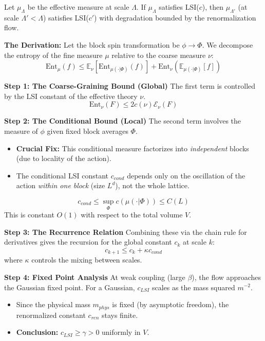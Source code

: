 \begin{theorem}
Let $\mu_\Lambda$ be the effective measure at scale $\Lambda$. If $\mu_\Lambda$ satisfies LSI($c$), then $\mu_{\Lambda'}$ (at scale $\Lambda' < \Lambda$) satisfies LSI($c'$) with degradation bounded by the renormalization flow.
\end{theorem}

\textbf{The Derivation:}
Let the block spin transformation be $\phi \to \Phi$. We decompose the entropy of the fine measure $\mu$ relative to the coarse measure $\nu$:
\begin{equation}
\text{Ent}_\mu(f) \le \mathbb{E}_\nu [\text{Ent}_{\mu(\cdot|\Phi)}(f)] + \text{Ent}_\nu(\mathbb{E}_{\mu(\cdot|\Phi)}[f])
\end{equation}

\textbf{Step 1: The Coarse-Graining Bound (Global)}
The first term is controlled by the LSI constant of the effective theory $\nu$.
\begin{equation}
\text{Ent}_\nu(F) \le 2 c(\nu) \mathcal{E}_\nu(F)
\end{equation}

\textbf{Step 2: The Conditional Bound (Local)}
The second term involves the measure of $\phi$ given fixed block averages $\Phi$.
\begin{itemize}
    \item \textbf{Crucial Fix:} This conditional measure factorizes into \textit{independent} blocks (due to locality of the action).
    \item The conditional LSI constant $c_{cond}$ depends only on the oscillation of the action \textit{within one block} (size $L^d$), not the whole lattice.
\end{itemize}
\begin{equation}
c_{cond} \le \sup_{\Phi} c(\mu(\cdot|\Phi)) \le C(L)
\end{equation}
This is constant $O(1)$ with respect to the total volume $V$.

\textbf{Step 3: The Recurrence Relation}
Combining these via the chain rule for derivatives gives the recursion for the global constant $c_k$ at scale $k$:
\begin{equation}
c_{k+1} \le c_k + \kappa c_{cond}
\end{equation}
where $\kappa$ controls the mixing between scales.

\textbf{Step 4: Fixed Point Analysis}
At weak coupling (large $\beta$), the flow approaches the Gaussian fixed point. For a Gaussian, $c_{LSI}$ scales as the mass squared $m^{-2}$.
\begin{itemize}
    \item Since the physical mass $m_{phys}$ is fixed (by asymptotic freedom), the renormalized constant $c_{ren}$ stays finite.
    \item \textbf{Conclusion:} $c_{LSI} \ge \gamma > 0$ uniformly in $V$.
\end{itemize}

